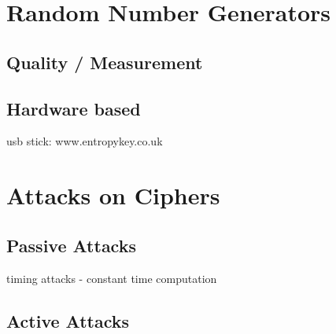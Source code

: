 \section{Random Number Generators}

\subsection{Quality / Measurement}

\subsection{Hardware based}

usb stick: 
www.entropykey.co.uk


\section{Attacks on Ciphers}

\subsection{Passive Attacks}

timing attacks - constant time computation

\subsection{Active Attacks}